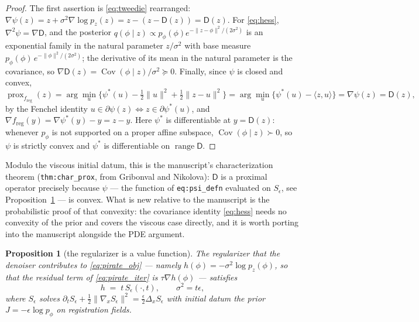 \documentclass[11pt]{article}
\newtheorem{proposition}{Proposition}
\theoremstyle{definition}
\newcommand{\Cov}{\operatorname{Cov}}
\newcommand{\D}{\mathsf{D}}
\newcommand{\freg}{f_{\mathrm{reg}}}
\newcommand{\prox}{\operatorname{prox}}
\newcommand{\range}{\operatorname{range}}
\newcommand{\code}[1]{\texttt{#1}}
\begin{document}
\begin{proof}
The first assertion is \eqref{eq:tweedie} rearranged: $\nabla\psi(z) = z + \sigma^2\nabla\log p_z(z) = z - (z-\D(z)) = \D(z)$. For \eqref{eq:hess}, $\nabla^2\psi = \nabla\D$, and the posterior $q(\phi\mid z)\propto p_\phi(\phi)e^{-\|z-\phi\|^2/(2\sigma^2)}$ is an exponential family in the natural parameter $z/\sigma^2$ with base measure $p_\phi(\phi)\,e^{-\|\phi\|^2/(2\sigma^2)}$; the derivative of its mean in the natural parameter is the covariance, so $\nabla\D(z) = \Cov(\phi\mid z)/\sigma^2\succeq0$. Finally, since $\psi$ is closed and convex,
\[
\prox_{\freg}(z) = \arg\min_u \Big\{\psi^*(u) - \tfrac12\|u\|^2 + \tfrac12\|z-u\|^2\Big\} = \arg\min_u\big\{\psi^*(u) - \langle z,u\rangle\big\} = \nabla\psi(z) = \D(z),
\]
by the Fenchel identity $u\in\partial\psi(z) \Leftrightarrow z\in\partial\psi^*(u)$, and $\nabla\freg(y) = \nabla\psi^*(y) - y = z-y$. Here $\psi^*$ is differentiable at $y = \D(z)$: whenever $p_\phi$ is not supported on a proper affine subspace, $\Cov(\phi\mid z)\succ0$, so $\psi$ is strictly convex and $\psi^*$ is differentiable on $\range\D$.
\end{proof}

Modulo the viscous initial datum, this is the manuscript's characterization theorem (\code{thm:char\_prox}, from Gribonval and Nikolova): $\D$ is a proximal operator precisely because $\psi$ — the function of \code{eq:psi\_defn} evaluated on $S_\epsilon$, see Proposition~\ref{prop:hj} — is convex. What is new relative to the manuscript is the probabilistic proof of that convexity: the covariance identity \eqref{eq:hess} needs no convexity of the prior and covers the viscous case directly, and it is worth porting into the manuscript alongside the PDE argument.

\begin{proposition}[the regularizer is a value function]
\label{prop:hj}
The regularizer that the denoiser contributes to \eqref{eq:pirate_obj} — namely $h(\phi) = -\sigma^2\log p_z(\phi)$, so that the residual term of \eqref{eq:pirate_iter} is $\tau\nabla h(\phi)$ — satisfies
\begin{equation}
\label{eq:h_is_S}
h \;=\; t\,S_\epsilon(\cdot,t), \qquad \sigma^2 = t\epsilon,
\end{equation}
where $S_\epsilon$ solves $\partial_t S_\epsilon + \tfrac12\|\nabla_x S_\epsilon\|^2 = \tfrac{\epsilon}{2}\Delta_x S_\epsilon$ with initial datum the prior $J = -\epsilon\log p_\phi$ on registration fields.
\end{proposition}
\end{document}
